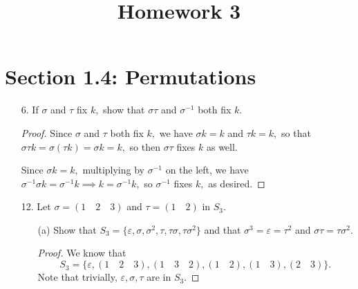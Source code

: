 \documentclass{article}
\begin{document}
\title{Homework 3}
\maketitle
\thispagestyle{fancy}

\section*{Section 1.4: Permutations}
\begin{itemize}
	\item[6.] If $\sigma$ and $\tau$ fix $k,$ show that $\sigma\tau$ and $\sigma^{-1}$ both fix $k.$
		\begin{proof}
			Since $\sigma$ and $\tau$ both fix $k,$ we have $\sigma k=k$ and $\tau k=k,$ so that $\sigma\tau k = \sigma (\tau k) = \sigma k = k,$ so then $\sigma\tau$ fixes $k$ as well. 

			Since $\sigma k=k,$ multiplying by $\sigma^{-1}$ on the left, we have $\sigma^{-1}\sigma k = \sigma^{-1}k \implies k=\sigma^{-1} k,$ so $\sigma^{-1}$ fixes $k,$ as desired.

		\end{proof}

	\item[12.] Let $\sigma=(1\quad2\quad3)$ and $\tau=(1\quad2)$ in $S_3.$

		\begin{itemize}
			\item[(a)] Show that $S_3=\{\varepsilon, \sigma, \sigma^2, \tau, \tau\sigma, \tau\sigma^2\}$ and that $\sigma^3=\varepsilon=\tau^2$ and $\sigma\tau=\tau\sigma^2.$
				\begin{proof}
					We know that \[S_3=\{\varepsilon, (1\quad2\quad3), (1\quad3\quad2), (1\quad2), (1\quad3), (2\quad3)\}. \] Note that trivially, $\varepsilon, \sigma, \tau$ are in $S_3.$ 


\end{proof}
\end{itemize}
\end{itemize}
\end{document}
